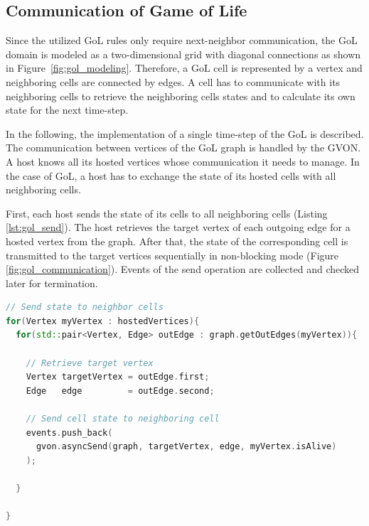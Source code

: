 \subsection{Communication of Game of Life}
\label{sec:gol_imp}
Since the utilized GoL rules only require next-neighbor communication,
the GoL domain is modeled as a two-dimensional grid with diagonal
connections as shown in Figure~\ref{fig:gol_modeling}. Therefore, a
GoL cell is represented by a vertex and neighboring cells are
connected by edges. A cell has to communicate with its neighboring
cells to retrieve the neighboring cells states and to calculate its own
state for the next time-step.

In the following, the implementation of a single time-step of the GoL
is described. The communication between vertices of the GoL graph is
handled by the GVON. A host knows all its hosted vertices whose
communication it needs to manage. In the case of GoL, a host has to
exchange the state of its hosted cells with all neighboring cells.

First, each host sends the state of its cells to all neighboring
cells (Listing \ref{lst:gol_send}). The host retrieves the target
vertex of each outgoing edge for a hosted vertex from the graph. After that,
the state of the corresponding cell is transmitted to the target vertices
sequentially in non-blocking mode (Figure
\ref{fig:gol_communication}). Events of the send operation are
collected and checked later for termination.

\begin{lstlisting}[language=C++, label=lst:gol_send, caption={\ }]
// Send state to neighbor cells
for(Vertex myVertex : hostedVertices){
  for(std::pair<Vertex, Edge> outEdge : graph.getOutEdges(myVertex)){

    // Retrieve target vertex
    Vertex targetVertex = outEdge.first;
    Edge   edge         = outEdge.second;

    // Send cell state to neighboring cell
    events.push_back(
      gvon.asyncSend(graph, targetVertex, edge, myVertex.isAlive)
    );

  }

}
\end{lstlisting}


